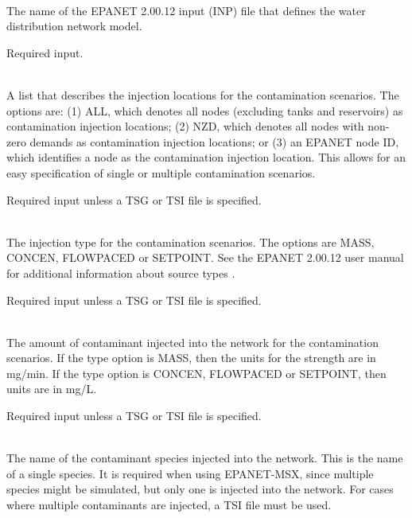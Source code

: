 \begin{description}[topsep=0pt,parsep=0.5em,itemsep=-0.4em]
  \item[{network}]\hfill
  \begin{description}[topsep=0pt,parsep=0.5em,itemsep=-0.4em]
    \item[{epanet file}]\hfill
\\ The name of the EPANET 2.00.12 input (INP) file that defines the water distribution
                network model.
                
                Required input.
  \end{description}
  \item[{scenario}]\hfill
  \begin{description}[topsep=0pt,parsep=0.5em,itemsep=-0.4em]
    \item[{location}]\hfill
\\A list that describes the injection locations for the contamination scenarios.
                The options are: (1) ALL, which denotes all nodes (excluding tanks and reservoirs)
                as contamination injection locations; (2) NZD, which denotes all nodes with
                non-zero demands as contamination injection locations; or (3) an EPANET node ID, 
                which identifies a node as the contamination injection location. This allows 
                for an easy specification of single or multiple contamination scenarios.
                
                Required input unless a TSG or TSI file is specified.
    \item[{type}]\hfill
\\The injection type for the contamination scenarios. The options are MASS, CONCEN, FLOWPACED or SETPOINT. 
                See the EPANET 2.00.12 user manual for additional information about source types \citep{EPANETusermanual}.
                
                Required input unless a TSG or TSI file is specified.
    \item[{strength}]\hfill
\\The amount of contaminant injected into the network for the contamination scenarios.  
                If the type option is MASS, then the units for the strength are in mg/min. 
                If the type option is CONCEN, FLOWPACED or SETPOINT, then units are in mg/L.
                
                Required input unless a TSG or TSI file is specified.
    \item[{species}]\hfill
\\The name of the contaminant species injected into the network. This is the name of a single species. 
                It is required when using EPANET-MSX, since multiple species might be simulated, but
                only one is injected into the network. For cases where multiple contaminants are injected,
                a TSI file must be used.
                

\end{description}
\end{description}
